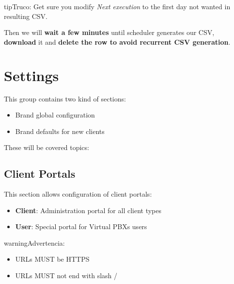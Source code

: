 \documentclass[letterpaper,10pt,spanish]{sphinxmanual}
\begin{document}
\begin{notice}{tip}{Truco:}
Get sure you modify \emph{Next execution} to the first day not wanted in resulting CSV.
\end{notice}

Then we will \textbf{wait a few minutes} until scheduler generates our CSV, \textbf{download} it and \textbf{delete the row to avoid recurrent
CSV generation}.


\section{Settings}
\label{administration_portal/brand/settings/index::doc}\label{administration_portal/brand/settings/index:settings}
This group contains two kind of sections:
\begin{itemize}
\item {} 
Brand global configuration

\item {} 
Brand defaults for new clients

\end{itemize}

These will be covered topics:
\label{administration_portal/brand/settings/client_portals:client-portals}

\subsection{Client Portals}
\label{administration_portal/brand/settings/client_portals:client-portals}\label{administration_portal/brand/settings/client_portals:id2}\label{administration_portal/brand/settings/client_portals::doc}\label{administration_portal/brand/settings/client_portals:id1}
This section allows configuration of client portals:
\begin{itemize}
\item {} 
\textbf{Client}: Administration portal for all client types

\item {} 
\textbf{User}: Special portal for Virtual PBXs users

\end{itemize}

\begin{notice}{warning}{Advertencia:}\begin{itemize}
\item {} 
URLs MUST be HTTPS

\item {} 
URLs MUST not end with slash /

\end{itemize}
\end{notice}
\end{document}

